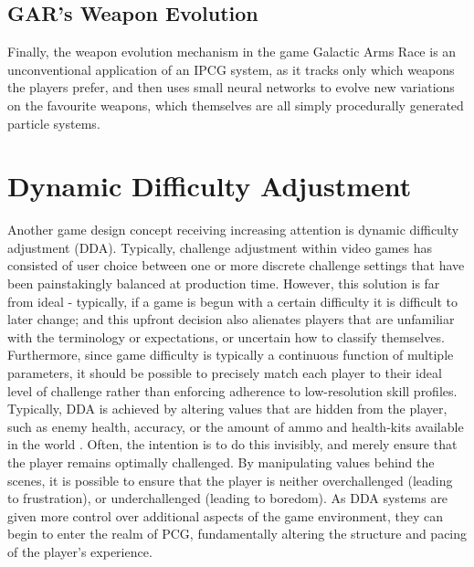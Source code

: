 \documentclass[a4paper,oneside,12pt,openany]{memoir}
\begin{document}
\subsection{GAR's Weapon Evolution}
Finally, the weapon evolution mechanism in the game Galactic Arms Race\cite{garmsr} is an unconventional application of an IPCG system, as it tracks only which weapons the players prefer, and then uses small neural networks to evolve new variations on the favourite weapons, which themselves are all simply procedurally generated particle systems\cite{Hastings:2009:IEP:1650356.1650369}.

\section{Dynamic Difficulty Adjustment}
Another game design concept receiving increasing attention is dynamic difficulty adjustment (DDA). Typically, challenge adjustment within video games has consisted of user choice between one or more discrete challenge settings that have been painstakingly balanced at production time. However, this solution is far from ideal - typically, if a game is begun with a certain difficulty it is difficult to later change; and this upfront decision also alienates players that are unfamiliar with the terminology or expectations, or uncertain how to classify themselves\cite{5765665}. Furthermore, since game difficulty is typically a continuous function of multiple parameters, it should be possible to precisely match each player to their ideal level of challenge rather than enforcing adherence to low-resolution skill profiles. Typically, DDA is achieved by altering values that are hidden from the player, such as enemy health, accuracy, or the amount of ammo and health-kits available in the world \cite{hamlet}. Often, the intention is to do this invisibly, and merely ensure that the player remains optimally challenged. By manipulating values behind the scenes, it is possible to ensure that the player is neither overchallenged (leading to frustration), or underchallenged (leading to boredom)\cite{flow}. As DDA systems are given more control over additional aspects of the game environment, they can begin to enter the realm of PCG, fundamentally altering the structure and pacing of the player's experience. 
\end{document}
